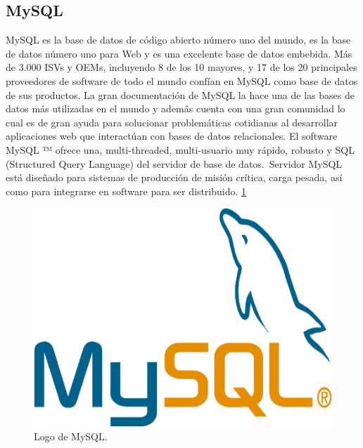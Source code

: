 \subsection{MySQL}
MySQL es la base de datos de código abierto número uno del mundo, es la base de datos número uno para Web y es una excelente base de datos embebida. Más de 3.000 ISVs y OEMs, incluyendo 8 de los 10 mayores, y 17 de los 20 principales proveedores de software de todo el mundo confían en MySQL como base de datos de sus productos.
La gran documentación de MySQL la hace una de las bases de datos más utilizadas en el mundo y además cuenta con una gran comunidad lo cual es de gran ayuda para solucionar problemáticas cotidianas al desarrollar aplicaciones web que interactúan con bases de datos relacionales.
El software MySQL ™ ofrece una, multi-threaded, multi-usuario muy rápido, robusto y SQL (Structured Query Language) del servidor de base de datos. Servidor MySQL está diseñado para sistemas de producción de misión crítica, carga pesada, así como para integrarse en software para ser distribuido. \cite{mysql} \ref{figura12}
\begin{figure}[h]
  \label{figura12}
  \centering
  \includegraphics[scale=1]{lib/assets/12}
  \caption{Logo de MySQL.}
\end{figure}
